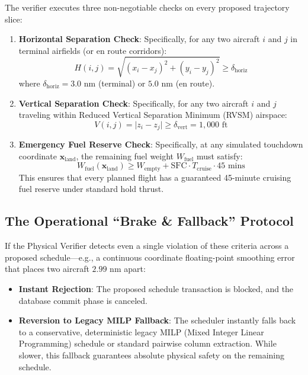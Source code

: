 \documentclass[11pt,a4paper]{book}
\begin{document}
The verifier executes three non-negotiable checks on every proposed trajectory slice:
\begin{enumerate}
\item \textbf{Horizontal Separation Check}: Specifically, for any two aircraft $i$ and $j$ in terminal airfields (or en route corridors):
\begin{equation}
\label{eq:horiz_check}
H(i, j) = \sqrt{(x_i - x_j)^2 + (y_i - y_j)^2} \ge \delta_{\text{horiz}}
\end{equation}
where $\delta_{\text{horiz}} = 3.0 \text{ nm}$ (terminal) or $5.0 \text{ nm}$ (en route).
\item \textbf{Vertical Separation Check}: Specifically, for any two aircraft $i$ and $j$ traveling within Reduced Vertical Separation Minimum (RVSM) airspace:
\begin{equation}
\label{eq:vert_check}
V(i, j) = \lvert z_i - z_j \rvert \ge \delta_{\text{vert}} = 1,000 \text{ ft}
\end{equation}
\item \textbf{Emergency Fuel Reserve Check}: Specifically, at any simulated touchdown coordinate $\mathbf{x}_{\text{land}}$, the remaining fuel weight $W_{\text{fuel}}$ must satisfy:
\begin{equation}
\label{eq:fuel_check}
W_{\text{fuel}}(\mathbf{x}_{\text{land}}) \ge W_{\text{empty}} + \text{SFC} \cdot T_{\text{cruise}} \cdot 45\text{ mins}
\end{equation}
This ensures that every planned flight has a guaranteed 45-minute cruising fuel reserve under standard hold thrust.
\end{enumerate}

\subsection{The Operational ``Brake \& Fallback'' Protocol}\label{subsec:protocol}

If the Physical Verifier detects even a single violation of these criteria across a proposed schedule---e.g., a continuous coordinate floating-point smoothing error that places two aircraft $2.99 \text{ nm}$ apart:
\begin{itemize}
\item \textbf{Instant Rejection}: The proposed schedule transaction is blocked, and the database commit phase is canceled.
\item \textbf{Reversion to Legacy MILP Fallback}: The scheduler instantly falls back to a conservative, deterministic legacy MILP (Mixed Integer Linear Programming) schedule or standard pairwise column extraction. While slower, this fallback guarantees absolute physical safety on the remaining schedule.
\end{itemize}
\end{document}
